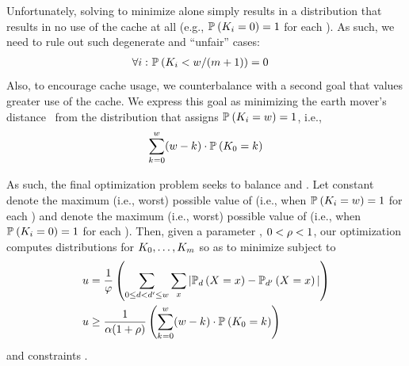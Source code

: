 Unfortunately, solving to minimize  alone
simply results in a distribution that results in no use of the cache
at all (e.g., $\mathbb{P}_{}\left({K_{i}=0}\right) = 1$ for
each \containerIdx).  As such, we need to rule out such degenerate
and ``unfair'' cases:
\begin{align}
\forall i:~ &
\mathbb{P}_{}\left({K_{i}
        < w/(m+1)}\right) = 0
\label{eqn:fairness}
\end{align}
Also, to encourage cache usage, we counterbalance
 with a second goal that
values greater use of the cache.  We express this goal as minimizing
the earth mover's distance~\cite{elizaveta2001emd} from
the distribution that assigns
$\mathbb{P}_{}\left({K_{i} = w}\right) = 1$,
i.e.,
\begin{align}
\sum_{k_{}=0}^{w} (w-k_{})
\cdot \mathbb{P}_{}\left({K_{0} = k_{}}\right)
\label{eqn:performanceGoal}
\end{align}

As such, the final optimization problem seeks to balance
 and .  Let
constant \maxSecValue denote the maximum (i.e., worst) possible value
of  (i.e., when
$\mathbb{P}_{}\left({K_{i}=w}\right) = 1$ for
each \containerIdx) and \maxPerfValue denote the maximum (i.e., worst)
possible value of  (i.e., when
$\mathbb{P}_{}\left({K_{i}=0}\right) = 1$ for
each \containerIdx).  Then, given a parameter \balanceSlack, $0
< \rho < 1$, our optimization computes
distributions
for $K_{0}, \ldots, K_{m}$
so as to minimize \balanceValue subject to
\vspace{-5pt}
\begin{align*}
u & = \frac{1}{\varphi} \left(\sum_{0 \le d < d' \le w} \sum_{x} |\mathbb{P}_{d}\left({X = x}\right) - \mathbb{P}_{d'}\left({X = x}\right)|\right) \\
u & \ge \frac{1}{\alpha(1+\rho)} \left(\sum_{k_{}=0}^{w} (w-k_{})
\cdot \mathbb{P}_{}\left({K_{0} = k_{}}\right)\right)
\end{align*}
and constraints .

